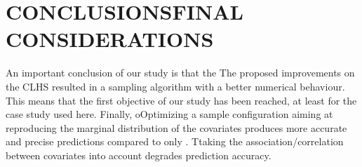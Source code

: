 \section{CONCLUSIONSFINAL CONSIDERATIONS}

An important conclusion of our study is that the The proposed improvements on the CLHS resulted in a sampling 
algorithm with a better numerical behaviour. This means that the first objective of our study has been 
reached, at least for the case study used here. Finally, oOptimizing a sample configuration aiming at 
reproducing the marginal distribution of the covariates produces more accurate and precise predictions compared 
to only . Ttaking the association/correlation between covariates into account degrades prediction accuracy.


